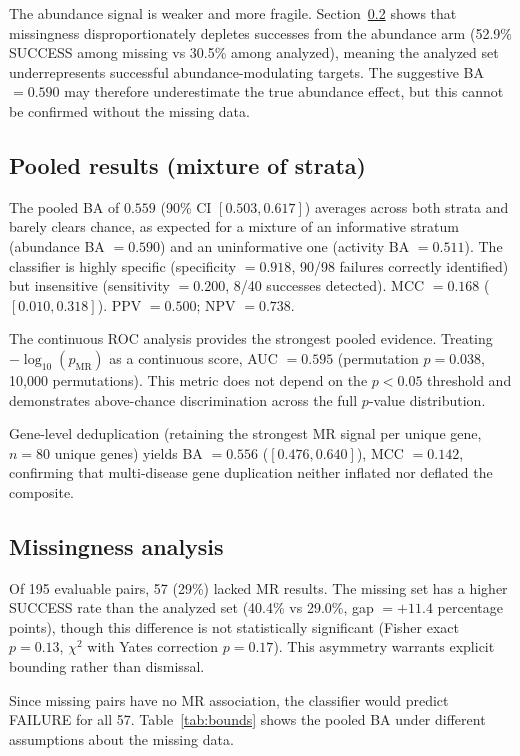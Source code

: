 \documentclass[11pt]{article}
\begin{document}
The abundance signal is weaker and more fragile. Section~\ref{sec:missing} shows that missingness disproportionately depletes successes from the abundance arm (52.9\% SUCCESS among missing vs 30.5\% among analyzed), meaning the analyzed set underrepresents successful abundance-modulating targets. The suggestive BA $= 0.590$ may therefore underestimate the true abundance effect, but this cannot be confirmed without the missing data.

\subsection{Pooled results (mixture of strata)}
\label{sec:primary}

The pooled BA of $0.559$ (90\% CI $[0.503, 0.617]$) averages across both strata and barely clears chance, as expected for a mixture of an informative stratum (abundance BA $= 0.590$) and an uninformative one (activity BA $= 0.511$). The classifier is highly specific (specificity $= 0.918$, 90/98 failures correctly identified) but insensitive (sensitivity $= 0.200$, 8/40 successes detected). MCC $= 0.168$ ($[0.010, 0.318]$). PPV $= 0.500$; NPV $= 0.738$.

The continuous ROC analysis provides the strongest pooled evidence. Treating $-\log_{10}(p_{\text{MR}})$ as a continuous score, AUC $= 0.595$ (permutation $p = 0.038$, 10{,}000 permutations). This metric does not depend on the $p < 0.05$ threshold and demonstrates above-chance discrimination across the full $p$-value distribution.

Gene-level deduplication (retaining the strongest MR signal per unique gene, $n = 80$ unique genes) yields BA $= 0.556$ ($[0.476, 0.640]$), MCC $= 0.142$, confirming that multi-disease gene duplication neither inflated nor deflated the composite.

\subsection{Missingness analysis}
\label{sec:missing}

Of 195 evaluable pairs, 57 (29\%) lacked MR results. The missing set has a higher SUCCESS rate than the analyzed set (40.4\% vs 29.0\%, gap $= +11.4$ percentage points), though this difference is not statistically significant (Fisher exact $p = 0.13$, $\chi^2$ with Yates correction $p = 0.17$). This asymmetry warrants explicit bounding rather than dismissal.

Since missing pairs have no MR association, the classifier would predict FAILURE for all 57. Table~\ref{tab:bounds} shows the pooled BA under different assumptions about the missing data.
\end{document}
